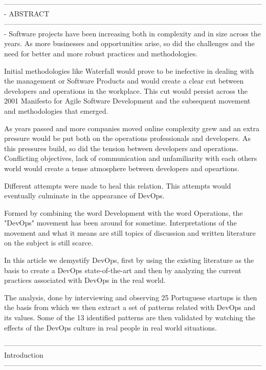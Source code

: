 -------------------------------------------------------------------------------------------------------------
		ABSTRACT 
-------------------------------------------------------------------------------------------------------------
Software projects have been increasing both in complexity and in size across the years. As more businesses and opportunities arise, so did the challenges and the need for better and more robust practices and methodologies. 

Initial methodologies like Waterfall would prove to be inefective in dealing with the management or Software Products and would create a clear cut between developers and operations in the workplace. This cut would persist across the 2001 Manifesto for Agile Software Development and the subsequent movement and methodologies that emerged.

As years passed and more companies moved online complexity grew and an extra pressure would be put both on the operations professionals and developers. As this pressures build, so did the tension between developers and operations. Conflicting objectives, lack of communication and unfamiliarity with each others world would create a tense atmosphere between developers and opeartions. 

Different attempts were made to heal this relation. This attempts would eventually culminate in the appearance of DevOps.

Formed by combining the word Development with the word Operations, the "DevOps" movement has been around for sometime. Interpretations of the movement and what it means are still topics of discussion and written literature on the subject is still scarce.

In this article we demystify DevOps, first by using the existing literature as the basis to create a DevOps state-of-the-art and then by analyzing the current practices associated with DevOps in the real world. 

The analysis, done by interviewing and observing 25 Portuguese startups is then the basis from which we then extract a set of patterns related with DevOps and its values. Some of the 13 identified patterns are then validated by watching the effects of the DevOps culture in real people in real world situations.


------------------------------------------------------------------------------------------------------------
		Introduction
------------------------------------------------------------------------------------------------------------

